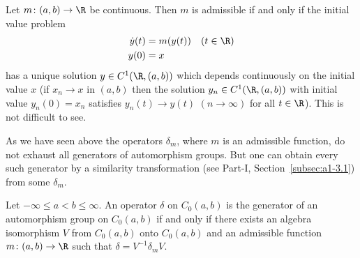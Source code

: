 \begin{remark*}\label{rem:b2-3.24}
%
Let $m \colon (a,b) \to \R$ be continuous.
Then $m$ is admissible if and only if the initial value problem
\begin{align*}
\dot{y}(t) &= m(y(t)) \quad (t \in \R) \\
y(0) &= x
\end{align*}
has a unique solution $y \in C^{1}(\R,(a,b))$ which depends continuously on the initial value $x$ (\ie  if\/ $x_{n} \to x$ in $(a,b)$ then the solution $y_{n} \in C^{1}(\R,(a,b))$ with initial value $y_{n}(0) = x_{n}$ satisfies $y_{n}(t) \to y(t)$ $(n \to \infty)$ for all $t \in \R$).
This is not difficult to see.
\end{remark*}
As we have seen above the operators $\delta_{m}$, where $m$ is an admissible function, do not exhaust all generators of automorphism groups.
But one can obtain every such generator by a similarity transformation (see Part-I, Section~\ref{subsec:a1-3.1}) from some $\delta_{m}$.
\begin{theorem}\label{thm:b2-3.24}
%
Let $-\infty \leq a < b \leq \infty$.
An operator $\delta$ on $C_{0}(a,b)$ is the generator of an automorphism group on $C_{0}(a,b)$ if and only if there exists an algebra isomorphism $V$ from $C_{0}(a,b)$ onto $C_{0}(a,b)$ and an admissible function $m \colon (a,b) \to \R$ such that $\delta = V^{-1}\delta_{m}V$.
\end{theorem}
